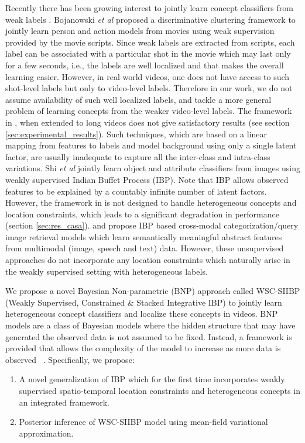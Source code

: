 \documentclass[runningheads]{llncs}
\begin{document}
Recently there has been growing interest to jointly learn concept classifiers from weak labels \cite{shi2014weakly,bojanowski2013finding}.  Bojanowski {\it et al} \cite{bojanowski2013finding} proposed a discriminative clustering framework to jointly learn person and action models from movies using weak supervision provided by the movie scripts. Since weak labels are extracted from scripts, each label can be associated with a particular shot in the movie which may last only for a few seconds, i.e., the labels are well localized and that makes the overall learning easier. 
However, in real world videos, one does not have access to such shot-level labels but only to video-level labels. Therefore in our work, we do not assume availability of such well localized labels, and tackle a  more general problem of learning concepts from the weaker video-level labels. The framework in \cite{bojanowski2013finding}, when extended to long videos does not give satisfactory results (see section \ref{sec:experimental_results}). Such techniques, which are based on a linear mapping from features to labels and model background using only a single latent factor, are usually inadequate to capture all the inter-class and intra-class variations.
Shi {\it et al} \cite{shi2014weakly} jointly learn object and attribute classifiers from images using weakly supervised Indian Buffet Process (IBP). Note that IBP \cite{ghahramani2005infinite,griffiths2011indian} 
allows observed features to be explained by a countably infinite number of latent factors. However, the framework in \cite{shi2014weakly} is not designed to handle heterogeneous concepts and location constraints, which leads to a significant degradation in performance (section \ref{sec:res_casa}). \cite{ozdemir2014probabilistic} and \cite{yildirim2012rational} propose IBP based cross-modal categorization/query image retrieval models which learn semantically meaningful abstract features from multimodal (image, speech and text) data. However, these unsupervised approaches do not incorporate any location constraints which naturally arise in the weakly supervised setting with heterogeneous labels.

We propose a novel Bayesian Non-parametric (BNP) approach called WSC-SIIBP (Weakly Supervised, Constrained \& Stacked Integrative IBP) to jointly learn heterogeneous concept classifiers and localize these concepts in videos. BNP models are a class of Bayesian models where the hidden structure that may have generated the observed data is not assumed to be fixed. Instead, a framework is provided that allows the complexity of the model to increase as more data is observed~ \cite{gershman2012tutorial}. Specifically, we propose: 
\vspace{-5mm}
\begin{enumerate}[leftmargin=*,noitemsep]
\item A novel generalization of IBP which for the first time incorporates weakly supervised spatio-temporal location constraints and heterogeneous concepts in an integrated framework.
\item Posterior inference of WSC-SIIBP model using mean-field variational approximation.
\end{enumerate}
\vspace{-2mm}
\end{document}

